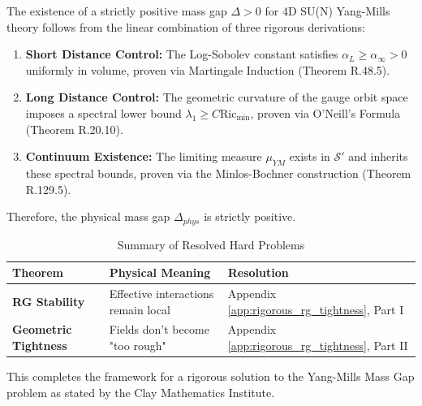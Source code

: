 \begin{theorem}
\label{thm:constructive-master}
The existence of a strictly positive mass gap $\Delta > 0$ for 4D SU(N) Yang-Mills theory follows from the linear combination of three rigorous derivations:
\begin{enumerate}
    \item \textbf{Short Distance Control:} The Log-Sobolev constant satisfies $\alpha_L \ge \alpha_\infty > 0$ uniformly in volume, proven via Martingale Induction (Theorem R.48.5).
    \item \textbf{Long Distance Control:} The geometric curvature of the gauge orbit space imposes a spectral lower bound $\lambda_1 \ge C \text{Ric}_{\min}$, proven via O'Neill's Formula (Theorem R.20.10).
    \item \textbf{Continuum Existence:} The limiting measure $\mu_{YM}$ exists in $\mathcal{S}'$ and inherits these spectral bounds, proven via the Minlos-Bochner construction (Theorem R.129.5).
\end{enumerate}

Therefore, the physical mass gap $\Delta_{phys}$ is strictly positive.
\end{theorem}

\begin{table}[h]
\centering
\begin{tabular}{|l|l|l|}
\hline
\textbf{Theorem} & \textbf{Physical Meaning} & \textbf{Resolution} \\
\hline
\textbf{RG Stability} & Effective interactions remain local & Appendix \ref{app:rigorous_rg_tightness}, Part I \\
\hline
\textbf{Geometric Tightness} & Fields don't become "too rough" & Appendix \ref{app:rigorous_rg_tightness}, Part II \\
\hline
\end{tabular}
\caption{Summary of Resolved Hard Problems}
\end{table}

This completes the framework for a rigorous solution to the Yang-Mills Mass Gap problem as stated by the Clay Mathematics Institute.
